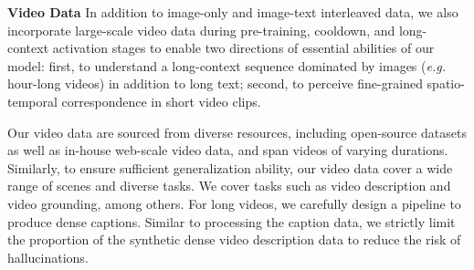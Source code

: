 \documentclass{article}
\begin{document}
\textbf{Video Data}  
In addition to image-only and image-text interleaved data, we also incorporate large-scale video data during pre-training, cooldown, and long-context activation stages to enable two directions of essential abilities of our model: first, to understand a long-context sequence dominated by images (\textit{e.g.} hour-long videos) in addition to long text; second, to perceive fine-grained spatio-temporal correspondence in short video clips.

Our video data are sourced from diverse resources, including open-source datasets as well as in-house web-scale video data, and span videos of varying durations.
Similarly, to ensure sufficient generalization ability, our video data cover a wide range of scenes and diverse tasks. We cover tasks such as video description and video grounding, among others.
For long videos, we carefully design a pipeline to produce dense captions. Similar to processing the caption data, we strictly limit the proportion of the synthetic dense video description data to reduce the risk of hallucinations.
\end{document}
